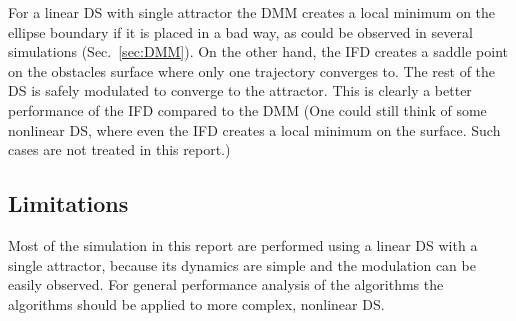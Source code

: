 For a linear DS with single attractor the DMM creates a local minimum on the ellipse boundary if it is placed in a bad way, as could be observed in several simulations (Sec.~\ref{sec:DMM}). On the other hand, the IFD creates a saddle point on the obstacles surface where only one trajectory converges to. The rest of the DS is safely modulated to converge to the attractor. This is clearly a better performance of the IFD compared to the DMM (One could still think of some nonlinear DS, where even the IFD creates a local minimum on the surface. Such cases are not treated in this report.)


\subsection{Limitations}
Most of the simulation in this report are performed using a linear DS with a single attractor, because its dynamics are simple and the modulation can be easily observed. For general performance analysis of the algorithms the algorithms should be applied to more complex, nonlinear DS. \\

